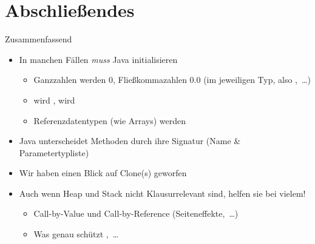 \section{Abschließendes}
{\SummaryFrame
\begin{frame}[t]{Zusammenfassend}
\pause \printBibCommand
\vfill\vfill %
\begin{itemize}[<+(1)->]
    \itemsep6.5pt
    \item In manchen Fällen \textit{muss} Java initialisieren  \begin{itemize}
        \item Ganzzahlen werden \(0\), Fließkommazahlen \(0.0\) (im jeweiligen Typ, also ,~\ldots)
        \item {} wird ,  wird  
        \item Referenzdatentypen (wie Arrays) werden 
    \end{itemize}
    \item Java unterscheidet Methoden durch ihre Signatur (Name \& Parametertypliste)
    \item Wir haben einen Blick auf Clone(s) geworfen 
    \item Auch wenn Heap und Stack nicht Klausurrelevant sind, helfen sie bei vielem! \begin{itemize}
        \item Call-by-Value und Call-by-Reference (Seiteneffekte,~\ldots)
        \item Was genau schützt ,~\ldots
    \end{itemize}
\end{itemize}
\end{frame}
}



\iffull\fi
